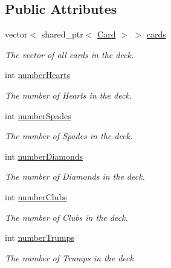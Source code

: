 \subsection*{Public Attributes}
\begin{DoxyCompactItemize}
\item 
\hypertarget{classDeck_a6b1a1cb4731888fe92e381dd74eb1e16}{vector$<$ shared\-\_\-ptr$<$ \hyperlink{classCard}{Card} $>$ $>$ \hyperlink{classDeck_a6b1a1cb4731888fe92e381dd74eb1e16}{cards}}\label{classDeck_a6b1a1cb4731888fe92e381dd74eb1e16}

\begin{DoxyCompactList}\small\item\em The vector of all cards in the deck. \end{DoxyCompactList}\item 
\hypertarget{classDeck_ac42ed01da688a430609cac03c00b2a5a}{int \hyperlink{classDeck_ac42ed01da688a430609cac03c00b2a5a}{number\-Hearts}}\label{classDeck_ac42ed01da688a430609cac03c00b2a5a}

\begin{DoxyCompactList}\small\item\em The number of Hearts in the deck. \end{DoxyCompactList}\item 
\hypertarget{classDeck_a3f3e1163d62a3e6136d2a1104b93f80d}{int \hyperlink{classDeck_a3f3e1163d62a3e6136d2a1104b93f80d}{number\-Spades}}\label{classDeck_a3f3e1163d62a3e6136d2a1104b93f80d}

\begin{DoxyCompactList}\small\item\em The number of Spades in the deck. \end{DoxyCompactList}\item 
\hypertarget{classDeck_ac36c6f248cf951b54580d6eba0734e3b}{int \hyperlink{classDeck_ac36c6f248cf951b54580d6eba0734e3b}{number\-Diamonds}}\label{classDeck_ac36c6f248cf951b54580d6eba0734e3b}

\begin{DoxyCompactList}\small\item\em The number of Diamonds in the deck. \end{DoxyCompactList}\item 
\hypertarget{classDeck_af3ff1d8bc6de0cc05a1fe64b5c70b38a}{int \hyperlink{classDeck_af3ff1d8bc6de0cc05a1fe64b5c70b38a}{number\-Clubs}}\label{classDeck_af3ff1d8bc6de0cc05a1fe64b5c70b38a}

\begin{DoxyCompactList}\small\item\em The number of Clubs in the deck. \end{DoxyCompactList}\item 
\hypertarget{classDeck_a7ddd8527b161887e1ae4023e371c1093}{int \hyperlink{classDeck_a7ddd8527b161887e1ae4023e371c1093}{number\-Trumps}}\label{classDeck_a7ddd8527b161887e1ae4023e371c1093}

\begin{DoxyCompactList}\small\item\em The number of Trumps in the deck. \end{DoxyCompactList}\end{DoxyCompactItemize}


